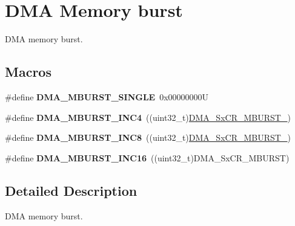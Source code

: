 \hypertarget{group___d_m_a___memory__burst}{}\section{D\+MA Memory burst}
\label{group___d_m_a___memory__burst}


D\+MA memory burst.  


\subsection*{Macros}
\begin{DoxyCompactItemize}
\item 
\mbox{\label{group___d_m_a___memory__burst_ga4e94b7250e6a4f53d702b42b15796953}} 
\#define {\bfseries D\+M\+A\+\_\+\+M\+B\+U\+R\+S\+T\+\_\+\+S\+I\+N\+G\+LE}~0x00000000U
\item 
\mbox{\label{group___d_m_a___memory__burst_gac9efcb13b2f0a715edb931dde213c000}} 
\#define {\bfseries D\+M\+A\+\_\+\+M\+B\+U\+R\+S\+T\+\_\+\+I\+N\+C4}~((uint32\+\_\+t)\hyperlink{group___peripheral___registers___bits___definition_ga1e3931a8f14ffe008b8717e1b3232fca}{D\+M\+A\+\_\+\+Sx\+C\+R\+\_\+\+M\+B\+U\+R\+S\+T\+\_})
\item 
\mbox{\label{group___d_m_a___memory__burst_ga4b8834930bb3b93cd3fcf04660b6933d}} 
\#define {\bfseries D\+M\+A\+\_\+\+M\+B\+U\+R\+S\+T\+\_\+\+I\+N\+C8}~((uint32\+\_\+t)\hyperlink{group___peripheral___registers___bits___definition_gaf28eac7212392083bbf1b3d475022b74}{D\+M\+A\+\_\+\+Sx\+C\+R\+\_\+\+M\+B\+U\+R\+S\+T\+\_})
\item 
\mbox{\label{group___d_m_a___memory__burst_ga7812aea620b09c4f4281d614d86e6094}} 
\#define {\bfseries D\+M\+A\+\_\+\+M\+B\+U\+R\+S\+T\+\_\+\+I\+N\+C16}~((uint32\+\_\+t)D\+M\+A\+\_\+\+Sx\+C\+R\+\_\+\+M\+B\+U\+R\+ST)
\end{DoxyCompactItemize}


\subsection{Detailed Description}
D\+MA memory burst. 

